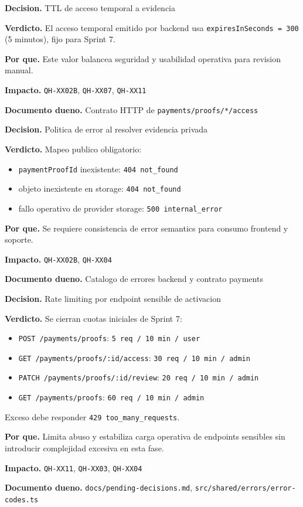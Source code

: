\begin{docnote}
\textbf{Decision.} TTL de acceso temporal a evidencia

\textbf{Verdicto.} El acceso temporal emitido por backend usa \texttt{expiresInSeconds = 300} (5 minutos), fijo para Sprint 7.

\textbf{Por que.} Este valor balancea seguridad y usabilidad operativa para revision manual.

\textbf{Impacto.} \texttt{QH-XX02B}, \texttt{QH-XX07}, \texttt{QH-XX11}

\textbf{Documento dueno.} Contrato HTTP de \texttt{payments/proofs/*/access}
\end{docnote}

\begin{docnote}
\textbf{Decision.} Politica de error al resolver evidencia privada

\textbf{Verdicto.} Mapeo publico obligatorio:
\begin{itemize}
  \item \texttt{paymentProofId} inexistente: \texttt{404 not\_found}
  \item objeto inexistente en storage: \texttt{404 not\_found}
  \item fallo operativo de provider storage: \texttt{500 internal\_error}
\end{itemize}

\textbf{Por que.} Se requiere consistencia de error semantics para consumo frontend y soporte.

\textbf{Impacto.} \texttt{QH-XX02B}, \texttt{QH-XX04}

\textbf{Documento dueno.} Catalogo de errores backend y contrato payments
\end{docnote}

\begin{docnote}
\textbf{Decision.} Rate limiting por endpoint sensible de activacion

\textbf{Verdicto.} Se cierran cuotas iniciales de Sprint 7:
\begin{itemize}
  \item \texttt{POST /payments/proofs}: \texttt{5 req / 10 min / user}
  \item \texttt{GET /payments/proofs/:id/access}: \texttt{30 req / 10 min / admin}
  \item \texttt{PATCH /payments/proofs/:id/review}: \texttt{20 req / 10 min / admin}
  \item \texttt{GET /payments/proofs}: \texttt{60 req / 10 min / admin}
\end{itemize}
Exceso debe responder \texttt{429 too\_many\_requests}.

\textbf{Por que.} Limita abuso y estabiliza carga operativa de endpoints sensibles sin introducir complejidad excesiva en esta fase.

\textbf{Impacto.} \texttt{QH-XX11}, \texttt{QH-XX03}, \texttt{QH-XX04}

\textbf{Documento dueno.} \texttt{docs/pending-decisions.md}, \texttt{src/shared/errors/error-codes.ts}
\end{docnote}

